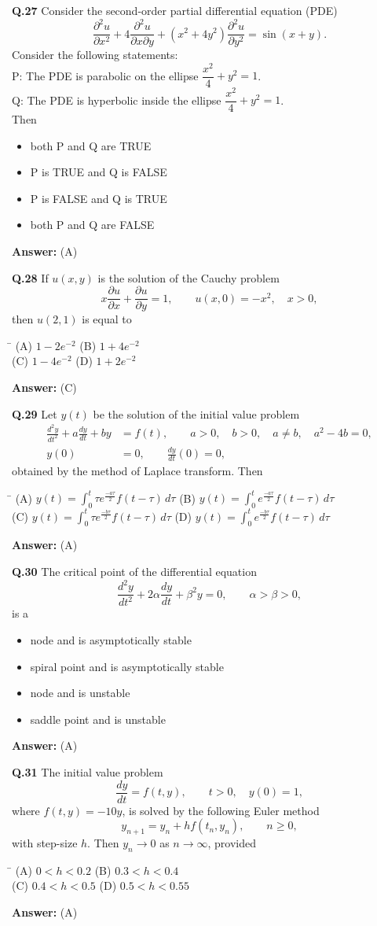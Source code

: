\documentclass[11pt,a4paper]{article}
\newcommand{\optsfourA}[4]{%
  \begin{tabbing}
    \hspace{0.48\linewidth}\=\kill
    (A) #1 \> (B) #2 \\[2pt]
    (C) #3 \> (D) #4
  \end{tabbing}%
}
\newcommand{\optslistA}[4]{%
  \begin{itemize}
    \setlength{\itemsep}{2pt}\setlength{\parskip}{0pt}
    \item[(A)] #1
    \item[(B)] #2
    \item[(C)] #3
    \item[(D)] #4
  \end{itemize}%
}
\newcommand{\ans}[1]{\textbf{Answer:} #1\par\medskip}
\begin{document}
\textbf{Q.27} Consider the second-order partial differential equation (PDE)
\[
  \frac{\partial^2 u}{\partial x^2} + 4\frac{\partial^2 u}{\partial x \partial y} + (x^2 + 4y^2)\frac{\partial^2 u}{\partial y^2} = \sin(x + y).
\]
Consider the following statements:\\
P: The PDE is parabolic on the ellipse $\dfrac{x^2}{4} + y^2 = 1$.\\
Q: The PDE is hyperbolic inside the ellipse $\dfrac{x^2}{4} + y^2 = 1$.\\
Then
\optslistA{both P and Q are TRUE}{P is TRUE and Q is FALSE}{P is FALSE and Q is TRUE}{both P and Q are FALSE}
\ans{(A)}

\textbf{Q.28} If $u(x, y)$ is the solution of the Cauchy problem
\[
  x\frac{\partial u}{\partial x} + \frac{\partial u}{\partial y} = 1, \qquad u(x, 0) = -x^2,\quad x > 0,
\]
then $u(2, 1)$ is equal to
\optsfourA{$1 - 2e^{-2}$}{$1 + 4e^{-2}$}{$1 - 4e^{-2}$}{$1 + 2e^{-2}$}
\ans{(C)}

\textbf{Q.29} Let $y(t)$ be the solution of the initial value problem
\begin{align*}
  \frac{d^2 y}{dt^2} + a\frac{dy}{dt} + by &= f(t), \qquad a > 0,\quad b > 0,\quad a \neq b,\quad a^2 - 4b = 0, \\
  y(0) &= 0, \qquad \frac{dy}{dt}(0) = 0,
\end{align*}
obtained by the method of Laplace transform. Then
\optsfourA{$y(t) = \displaystyle\int_0^t \tau e^{\frac{-a\tau}{2}} f(t - \tau)\,d\tau$}{$y(t) = \displaystyle\int_0^t e^{\frac{-a\tau}{2}} f(t - \tau)\,d\tau$}{$y(t) = \displaystyle\int_0^t \tau e^{\frac{-b\tau}{2}} f(t - \tau)\,d\tau$}{$y(t) = \displaystyle\int_0^t e^{\frac{-b\tau}{2}} f(t - \tau)\,d\tau$}
\ans{(A)}

\textbf{Q.30} The critical point of the differential equation
\[
  \frac{d^2 y}{dt^2} + 2\alpha \frac{dy}{dt} + \beta^2 y = 0, \qquad \alpha > \beta > 0,
\]
is a
\optslistA{node and is asymptotically stable}{spiral point and is asymptotically stable}{node and is unstable}{saddle point and is unstable}
\ans{(A)}

\textbf{Q.31} The initial value problem
\[
  \frac{dy}{dt} = f(t, y), \qquad t > 0,\quad y(0) = 1,
\]
where $f(t, y) = -10y$, is solved by the following Euler method
\[
  y_{n+1} = y_n + h f(t_n, y_n), \qquad n \ge 0,
\]
with step-size $h$. Then $y_n \to 0$ as $n \to \infty$, provided
\optsfourA{$0 < h < 0.2$}{$0.3 < h < 0.4$}{$0.4 < h < 0.5$}{$0.5 < h < 0.55$}
\ans{(A)}
\end{document}

